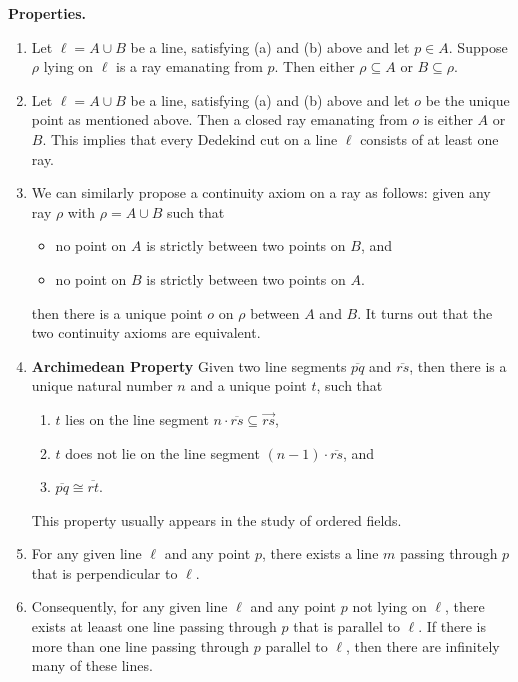\documentclass[12pt]{article}
\newcommand{\ray}[1]{\overrightarrow{#1}}
\begin{document}
\textbf{Properties.}
\begin{enumerate}
\item Let $\ell=A\cup B$ be a line, satisfying (a) and (b)
above and let $p\in A$.  Suppose $\rho$ lying on $\ell$ is a ray
emanating from $p$.  Then either $\rho\subseteq A$ or $B\subseteq
\rho$.
\item Let $\ell=A\cup B$ be a line, satisfying (a) and (b)
above and let $o$ be the unique point as mentioned above.  Then a
closed ray emanating from $o$ is either $A$ or $B$.
This implies that every Dedekind cut on a line
$\ell$ consists of at least one ray.
\item We can similarly propose a continuity axiom on a ray as follows: given any ray $\rho$ with $\rho=A\cup B$ such that
\begin{itemize}
\item no point on $A$ is strictly between two points on $B$, and
\item no point on $B$ is strictly between two points on $A$.
\end{itemize}
then there is a unique point $o$ on $\rho$ between $A$ and $B$.
It turns out that the two continuity axioms are equivalent.
\item \textbf{Archimedean Property}  Given two line segments $\overline{pq}$ and $\overline{rs}$, then there is a unique natural number $n$ and a unique point $t$, such that
\begin{enumerate}
\item $t$ lies on the line segment $n\cdot\overline{rs}\subseteq\ray{rs}$,
\item $t$ does not lie on the line segment
$(n-1)\cdot\overline{rs}$, and
\item $\overline{pq}\cong\overline{rt}$.
\end{enumerate}
This property usually appears in the study of ordered fields.
\item For any given line $\ell$ and any point $p$, there exists a line $m$ passing through $p$ that is perpendicular to $\ell$.
\item Consequently, for any given line $\ell$ and any point $p$ not lying on $\ell$, there exists at leaast one line passing through $p$ that is parallel to $\ell$.  If there is more than one line passing through $p$ parallel to $\ell$, then there are infinitely many of these lines.
\end{enumerate}
\end{document}
